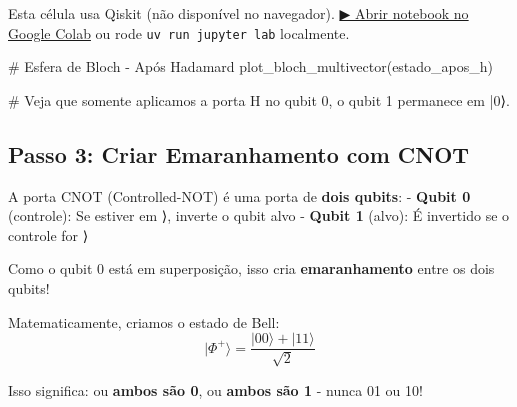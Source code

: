 \documentclass[
  brazilian,
]{report}
\newenvironment{Shaded}{\begin{snugshade}}{\end{snugshade}}
\newcommand{\CommentTok}[1]{\textcolor[rgb]{0.37,0.37,0.37}{#1}}
\newcommand{\NormalTok}[1]{\textcolor[rgb]{0.00,0.23,0.31}{#1}}
\begin{document}
\begin{tcolorbox}[enhanced jigsaw, arc=.35mm, bottomrule=.15mm, bottomtitle=1mm, breakable, colback=white, colbacktitle=quarto-callout-warning-color!10!white, colframe=quarto-callout-warning-color-frame, coltitle=black, left=2mm, leftrule=.75mm, opacityback=0, opacitybacktitle=0.6, rightrule=.15mm, title=\textcolor{quarto-callout-warning-color}{\faExclamationTriangle}\hspace{0.5em}{⚛️ Célula Qiskit --- execute no Colab ou localmente}, titlerule=0mm, toprule=.15mm, toptitle=1mm]

Esta célula usa Qiskit (não disponível no navegador).
\href{https://colab.research.google.com/github/maxwellamaral/aula-quantum/blob/main/notebooks/01-intro.ipynb}{▶
Abrir notebook no Google Colab} ou rode \texttt{uv\ run\ jupyter\ lab}
localmente.

\begin{Shaded}
\begin{Highlighting}[]

\CommentTok{\# Esfera de Bloch {-} Após Hadamard}
\NormalTok{plot\_bloch\_multivector(estado\_apos\_h)}

\CommentTok{\# Veja que somente aplicamos a porta H no qubit 0, o qubit 1 permanece em |0⟩.}
\end{Highlighting}
\end{Shaded}

\end{tcolorbox}

\subsection{Passo 3: Criar Emaranhamento com
CNOT}\label{passo-3-criar-emaranhamento-com-cnot}

A porta CNOT (Controlled-NOT) é uma porta de \textbf{dois qubits}: -
\textbf{Qubit 0} (controle): Se estiver em ⟩, inverte o qubit
alvo - \textbf{Qubit 1} (alvo): É invertido se o controle for ⟩

Como o qubit 0 está em superposição, isso cria \textbf{emaranhamento}
entre os dois qubits!

Matematicamente, criamos o estado de Bell:
\[|\Phi^+\rangle = \frac{|00\rangle + |11\rangle}{\sqrt{2}}\]

Isso significa: ou \textbf{ambos são 0}, ou \textbf{ambos são 1} - nunca
01 ou 10!
\end{document}
